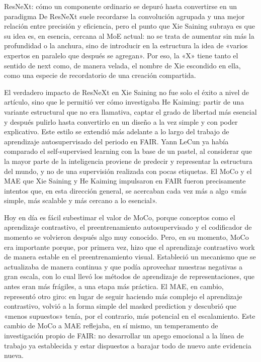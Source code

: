 \documentclass[a4paper,12pt]{article}
\begin{document}
\begin{importantbox}{ResNeXt: cómo un componente ordinario se depuró hasta convertirse en un paradigma}
De ResNeXt suele recordarse la convolución agrupada y una mejor relación entre precisión y eficiencia, pero el punto que Xie Saining subraya es que su idea es, en esencia, cercana al MoE actual: no se trata de aumentar sin más la profundidad o la anchura, sino de introducir en la estructura la idea de «varios expertos en paralelo que después se agregan». Por eso, la «X» tiene tanto el sentido de next como, de manera velada, el nombre de Xie escondido en ella, como una especie de recordatorio de una creación compartida.
\end{importantbox}

El verdadero impacto de ResNeXt en Xie Saining no fue solo el éxito a nivel de artículo, sino que le permitió ver cómo investigaba He Kaiming: partir de una variante estructural que no era llamativa, captar el grado de libertad más esencial y después pulirlo hasta convertirlo en un diseño a la vez simple y con poder explicativo. Este estilo se extendió más adelante a lo largo del trabajo de aprendizaje autosupervisado del periodo en FAIR. Yann LeCun ya había comparado el self-supervised learning con la base de un pastel, al considerar que la mayor parte de la inteligencia proviene de predecir y representar la estructura del mundo, y no de una supervisión realizada con pocas etiquetas. El MoCo y el MAE que Xie Saining y He Kaiming impulsaron en FAIR fueron precisamente intentos que, en esta dirección general, se acercaban cada vez más a algo «más simple, más scalable y más cercano a lo esencial».

Hoy en día es fácil subestimar el valor de MoCo, porque conceptos como el aprendizaje contrastivo, el preentrenamiento autosupervisado y el codificador de momento se volvieron después algo muy conocido. Pero, en su momento, MoCo era importante porque, por primera vez, hizo que el aprendizaje contrastivo work de manera estable en el preentrenamiento visual. Estableció un mecanismo que se actualizaba de manera continua y que podía aprovechar muestras negativas a gran escala, con lo cual llevó los métodos de aprendizaje de representaciones, que antes eran más frágiles, a una etapa más práctica. El MAE, en cambio, representó otro giro: en lugar de seguir haciendo más complejo el aprendizaje contrastivo, volvió a la forma simple del masked prediction y descubrió que «menos supuestos» tenía, por el contrario, más potencial en el escalamiento. Este cambio de MoCo a MAE reflejaba, en sí mismo, un temperamento de investigación propio de FAIR: no desarrollar un apego emocional a la línea de trabajo ya establecida y estar dispuestos a barajar todo de nuevo ante evidencia nueva.
\end{document}
